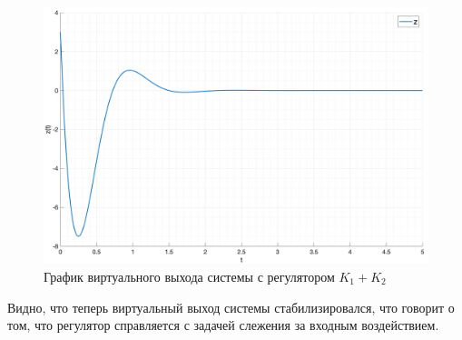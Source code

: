 \begin{figure}[ht!]
    \centering
    \includegraphics[width=\textwidth]{media/plots/task2_full_z.png}
    \caption{График виртуального выхода системы с регулятором $K_1 + K_2$}
    \label{fig:task2_full_z}
\end{figure}
Видно, что теперь виртуальный выход системы стабилизировался, что говорит о том, что 
регулятор справляется с задачей слежения за входным воздействием.

\FloatBarrier

